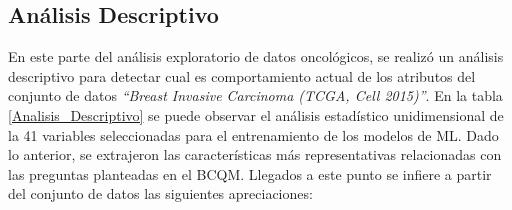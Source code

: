 \clearpage	
\newpage
\subsection{Análisis Descriptivo }
En este parte del análisis exploratorio de datos oncológicos, se realizó un análisis descriptivo para detectar cual es comportamiento actual de los atributos del conjunto de datos \textit{“Breast Invasive Carcinoma (TCGA, Cell 2015)”}. En la tabla \ref{Analisis_Descriptivo} se puede observar el análisis estadístico unidimensional de la 41 variables seleccionadas para el entrenamiento de los modelos de ML. Dado lo anterior, se extrajeron las características más representativas relacionadas con las preguntas planteadas en el BCQM. Llegados a este punto se infiere a partir del conjunto de datos las siguientes apreciaciones:

